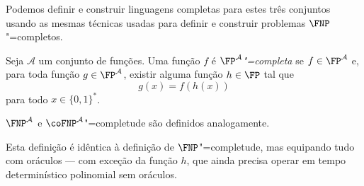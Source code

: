 Podemos definir e construir linguagens completas para estes três conjuntos
usando as mesmas técnicas usadas para definir e construir problemas $\FNP$"=completos.

\begin{definition}
    Seja $\mathcal A$ um conjunto de funções.
    Uma função $f$ é \emph{$\FP^\mathcal A$"=completa}
    se $f \in \FP^\mathcal A$ e,
    para toda função $g \in \FP^\mathcal A$,
    existir alguma função $h \in \FP$ tal que
    \begin{equation*}
        g(x) = f(h(x))
    \end{equation*}
    para todo $x \in \{0, 1\}^*$.

    $\FNP^\mathcal A$ e $\coFNP^\mathcal A$"=completude
    são definidos analogamente.
\end{definition}

Esta definição é idêntica à definição de $\FNP$"=completude,
mas equipando tudo com oráculos
--- com exceção da função $h$,
que ainda precisa operar em tempo determinístico polinomial sem oráculos.
